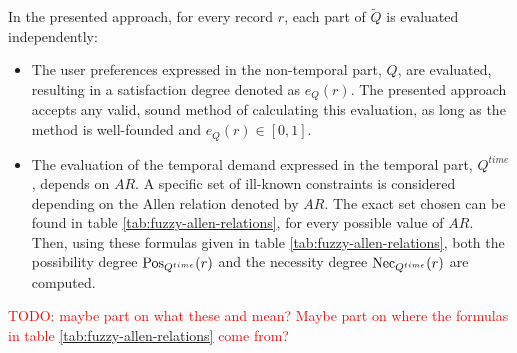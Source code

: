 In the presented approach, for every record $r$, each part of $\tilde{Q}$ is evaluated independently:
\begin{itemize}
\item
The user preferences expressed in the non-temporal part, $Q$, are evaluated, resulting in a satisfaction degree denoted as $e_Q(r)$. The presented approach accepts any valid, sound method of calculating this evaluation, as long as the method is well-founded and $e_Q(r) \in \left[0,1\right]$.
\item
The evaluation of the temporal demand expressed in the temporal part, $Q^{time}$, depends on $AR$. A specific set of ill-known constraints\cite{Pon11} is considered depending on the Allen relation denoted by $AR$. The exact set chosen can be found in table \ref{tab:fuzzy-allen-relations}, for every possible value of $AR$. Then, using these formulas given in table \ref{tab:fuzzy-allen-relations}, both the possibility degree $\operatorname{Pos}_{Q^{time}}(r)$ and the necessity degree $\operatorname{Nec}_{Q^{time}}(r)$ are computed.
\end{itemize}

\textcolor{red}{TODO: maybe part on what these and mean? Maybe part on where the formulas in table \ref{tab:fuzzy-allen-relations} come from?}

